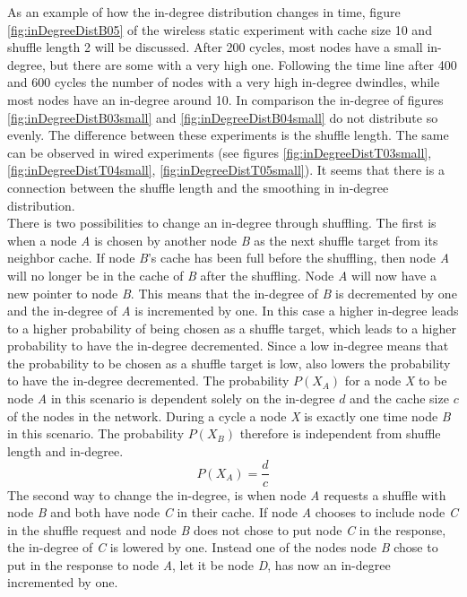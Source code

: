 As an example of how the in-degree distribution changes in time, figure
\ref{fig:inDegreeDistB05} of the wireless static experiment with cache size 10 and shuffle
length 2 will be discussed. After 200 cycles, most nodes have a small in-degree,
but there are some with a very high one. Following the time line after 400 and
600 cycles the number of nodes with a very high in-degree dwindles, while most
nodes have an in-degree around 10. In comparison the in-degree of figures
\ref{fig:inDegreeDistB03small} and \ref{fig:inDegreeDistB04small} do not
distribute so evenly. The difference between these experiments is the shuffle
length. The same can be observed in wired experiments (see figures
\ref{fig:inDegreeDistT03small},
\ref{fig:inDegreeDistT04small}, \ref{fig:inDegreeDistT05small}). It seems that
there is a connection between the shuffle length and the smoothing in in-degree distribution.\\
There is two possibilities to change an in-degree through shuffling. The first
is when a node \emph{A} is chosen by another node \emph{B} as the next shuffle
target from its neighbor cache. If node \emph{B}'s cache has been full before
the shuffling, then node \emph{A} will no longer be in the cache of \emph{B}
after the shuffling. Node \emph{A} will now have a new pointer to node \emph{B}.
This means that the in-degree of \emph{B} is decremented by one and the
in-degree of \emph{A} is incremented by one. In this case a higher in-degree leads to a higher probability of being chosen as a shuffle target, which leads to a higher
probability to have the in-degree decremented. Since a
low in-degree means that the probability to be chosen as a shuffle target is low, also lowers the
probability to have the in-degree decremented. The probability $P(X_A)$ for a
node \emph{X} to be node \emph{A} in this scenario is dependent solely on the
in-degree $d$ and the cache size $c$ of the nodes in the network. During a cycle
a node \emph{X} is exactly one time node \emph{B} in this scenario. The
probability $P(X_B)$ therefore is independent from
shuffle length and in-degree. \[P(X_A) = \frac{d}{c}\]
The second way to change the in-degree, is when node \emph{A} requests a shuffle
with node \emph{B} and both have node \emph{C} in their cache. If node \emph{A}
chooses to include node \emph{C} in the shuffle request and node \emph{B} does
not chose to put node \emph{C} in the response, the in-degree of \emph{C} is lowered
by one. Instead one of the nodes node \emph{B} chose to put in the response to
node \emph{A}, let it be node \emph{D}, has now an in-degree incremented by one.
